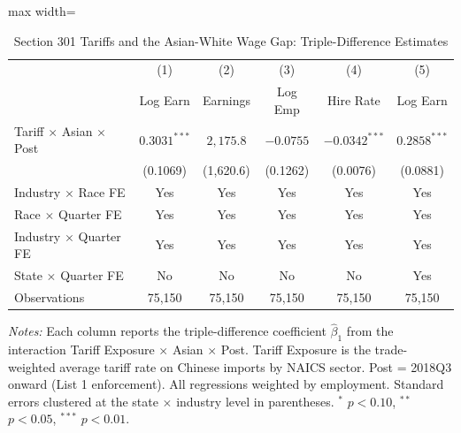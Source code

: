 \begin{table}[H]
\centering
\caption{Section 301 Tariffs and the Asian-White Wage Gap: Triple-Difference Estimates}
\begin{threeparttable}
\begin{adjustbox}{max width=\textwidth}
\begin{tabular}{lccccc}
\toprule
 & (1) & (2) & (3) & (4) & (5) \\
 & Log Earn & Earnings & Log Emp & Hire Rate & Log Earn \\
\midrule
Tariff $\times$ Asian $\times$ Post & $0.3031^{***}$ & $2,175.8$ & $-0.0755$ & $-0.0342^{***}$ & $0.2858^{***}$ \\
 & (0.1069) & (1,620.6) & (0.1262) & (0.0076) & (0.0881) \\
\midrule
Industry $\times$ Race FE & Yes & Yes & Yes & Yes & Yes \\
Race $\times$ Quarter FE & Yes & Yes & Yes & Yes & Yes \\
Industry $\times$ Quarter FE & Yes & Yes & Yes & Yes & Yes \\
State $\times$ Quarter FE & No & No & No & No & Yes \\
Observations & 75,150 & 75,150 & 75,150 & 75,150 & 75,150 \\
\bottomrule
\end{tabular}
\end{adjustbox}
\begin{tablenotes}[flushleft]
\small
\item \textit{Notes:} Each column reports the triple-difference coefficient $\hat{\beta}_1$ from the interaction Tariff Exposure $\times$ Asian $\times$ Post. Tariff Exposure is the trade-weighted average tariff rate on Chinese imports by NAICS sector. Post = 2018Q3 onward (List 1 enforcement). All regressions weighted by employment. Standard errors clustered at the state $\times$ industry level in parentheses. $^{*}$ $p<0.10$, $^{**}$ $p<0.05$, $^{***}$ $p<0.01$.
\end{tablenotes}
\end{threeparttable}
\label{tab:main}
\end{table}

